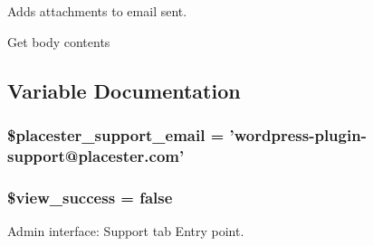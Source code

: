 Adds attachments to email sent. 



Get body contents



\subsection{Variable Documentation}
\hypertarget{support_8php_a71a6398e0304e7f0b68187d0e747a978}{
\subsubsection[{\$placester\_\-support\_\-email}]{\setlength{\rightskip}{0pt plus 5cm}\$placester\_\-support\_\-email = 'wordpress-\/plugin-\/support@placester.com'}}
\label{d2/d0f/support_8php_a71a6398e0304e7f0b68187d0e747a978}
\hypertarget{support_8php_abb388ebff52ac480d577be234950bbf6}{
\subsubsection[{\$view\_\-success}]{\setlength{\rightskip}{0pt plus 5cm}\$view\_\-success = false}}
\label{d2/d0f/support_8php_abb388ebff52ac480d577be234950bbf6}


Admin interface: Support tab Entry point. 

